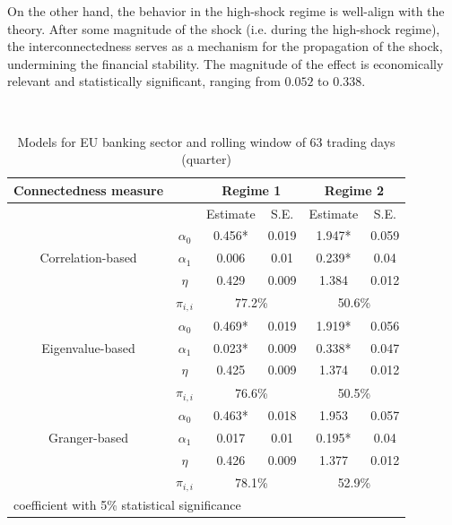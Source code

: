 \documentclass{article}
\begin{document}
On the other hand, the behavior in the high-shock regime is well-align with the theory. After some magnitude of the shock (i.e. during the high-shock regime), the interconnectedness serves as a mechanism for the propagation of the shock, undermining the financial stability. The magnitude of the effect is economically relevant and statistically significant, ranging from $0.052$ to $0.338$. 

\

\begin{table}
\caption{Models for EU banking sector and rolling window of 63 trading days (quarter)}
\begin{tabular}{cccccc}
  \toprule
   Connectedness measure &  & \multicolumn{2}{c}{\bfseries Regime 1} & \multicolumn{2}{c}{\bfseries Regime 2}  \\
   \hline
   & & Estimate & S.E. & Estimate & S.E. \\
   \hline
   \multirow{3}{*}[\normalbaselineskip]{Correlation-based} & $\alpha_0$ & 0.456* & 0.019 & 1.947*  & 0.059 \\
    & $\alpha_1$ & 0.006 & 0.01 & 0.239* & 0.04 \\
    & $\eta$ & 0.429 & 0.009 & 1.384 & 0.012 \\
    & $\pi_{i,i}$ &  \multicolumn{2}{c}{77.2\%} & \multicolumn{2}{c}{50.6\%}\\
    \hline
    \multirow{3}{*}[\normalbaselineskip]{Eigenvalue-based} & $\alpha_0$ & 0.469* & 0.019 & 1.919*  & 0.056 \\
    & $\alpha_1$ & 0.023* & 0.009 & 0.338* & 0.047 \\
    & $\eta$ & 0.425 & 0.009 & 1.374 & 0.012 \\
    & $\pi_{i,i}$ &  \multicolumn{2}{c}{76.6\%} & \multicolumn{2}{c}{50.5\%}\\
    \hline
    \multirow{3}{*}[\normalbaselineskip]{Granger-based} & $\alpha_0$ & 0.463* & 0.018 & 1.953  & 0.057 \\
    & $\alpha_1$ & 0.017 & 0.01 & 0.195* & 0.04 \\
    & $\eta$ & 0.426 & 0.009 & 1.377 & 0.012 \\
    & $\pi_{i,i}$ &  \multicolumn{2}{c}{78.1\%} & \multicolumn{2}{c}{52.9\%}\\
    \hline
  \multicolumn{6}{l}{\footnotesize * coefficient with 5\% statistical significance} \\
  \hline
\end{tabular}
\end{table}
\end{document}

